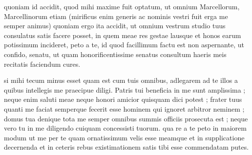 


 quoniam id accidit, quod mihi maxime fuit optatum, ut omnium Marcellorum, Marcellinorum etiam (mirificus enim generis ac nominis vestri fuit erga me semper animus) quoniam ergo ita accidit, ut omnium vestrum studio tuus consulatus satis facere posset, in quem meae res gestae lausque et honos earum potissimum incideret, peto a te, id quod facillimum factu est non aspernante, ut confido, senatu, ut quam honorificentissime senatus consultum haeris meis recitatis faciendum cures.

 si mihi tecum minus esset quam est cum tuis omnibus, adlegarem ad te illos a quibus intellegis me praecipue diligi. Patris tui beneficia in me sunt amplissima ; neque enim saluti meae neque honori amicior quisquam dici potest ; frater tuus quanti me faciat semperque fecerit esse hominem qui ignoret arbitror neminem ; domus tua denique tota me semper omnibus summis officiis prosecuta est ; neque vero tu in me diligendo cuiquam concessisti tuorum. qua re a te peto in maiorem modum ut me per te quam ornatissimum velis esse meamque et in supplicatione decernenda et in ceteris rebus existimationem satis tibi esse commendatam putes.
